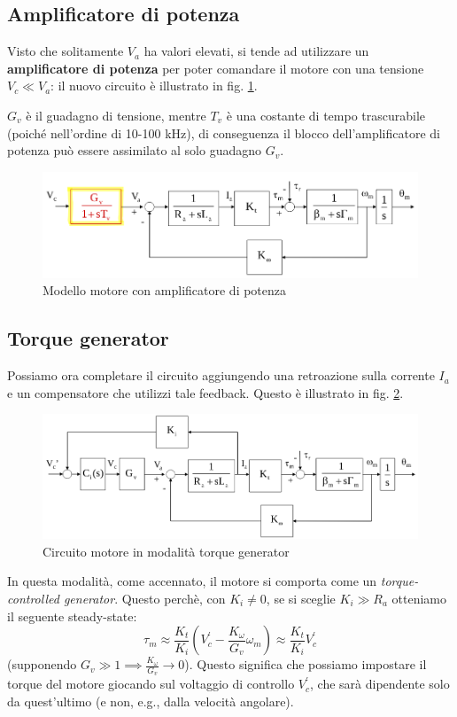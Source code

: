 \subsection{Amplificatore di potenza}
Visto che solitamente $V_a$ ha valori elevati, si tende ad utilizzare un \textbf{amplificatore di potenza} per poter comandare il motore con una tensione $V_c \ll V_a$: il nuovo circuito è illustrato in fig. \ref{fig:electricactuator2}. 

$G_v$ è il guadagno di tensione, mentre $T_v$ è una costante di tempo trascurabile (poiché nell’ordine di 10-100 kHz), di conseguenza il blocco dell’amplificatore di potenza può essere assimilato al solo guadagno $G_v$.


\begin{figure}[th!]
	\centering
	\includegraphics[width=0.7\linewidth]{images/electric_actuator_2}
	\caption{Modello motore con amplificatore di potenza}
	\label{fig:electricactuator2}
\end{figure}



\subsection{Torque generator}

Possiamo ora completare il circuito aggiungendo una retroazione sulla corrente $I_a$ e un compensatore che utilizzi tale feedback. Questo è illustrato in fig. \ref{fig:electricactuator3}.

\begin{figure}[th!]
	\centering
	\includegraphics[width=0.7\linewidth]{images/electric_actuator_3}
	\caption{Circuito motore in modalità torque generator}
	\label{fig:electricactuator3}
\end{figure}

In questa modalità, come accennato, il motore si comporta come un \textit{torque-controlled generator}. Questo perchè, con $K_i \neq 0$, se si sceglie $K_i \gg R_a$ otteniamo il seguente steady-state:
$$
\tau_m \approx \frac{K_t}{K_i}(V^{'}_c - \frac{K_\omega}{G_v}\omega_m)
\approx
\frac{K_t}{K_i}V^{'}_c
$$
(supponendo $G_v \gg 1 \implies \frac{K_\omega}{G_v} \to 0$). Questo significa che possiamo impostare il torque del motore giocando sul voltaggio di controllo $V^{'}_c$, che sarà dipendente solo da quest'ultimo (e non, e.g., dalla velocità angolare).




